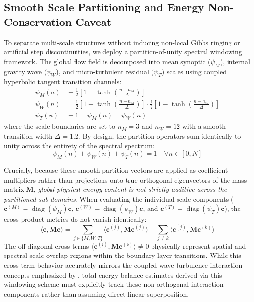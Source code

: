 \subsection{Smooth Scale Partitioning and Energy Non-Conservation Caveat}
\label{sec:methods:partition}

To separate multi-scale structures without inducing non-local Gibbs ringing or artificial step discontinuities, we deploy a partition-of-unity spectral windowing framework. The global flow field is decomposed into mean synoptic ($\psi_M$), internal gravity wave ($\psi_W$), and micro-turbulent residual ($\psi_T$) scales using coupled hyperbolic tangent transition channels:
\begin{align}
    \psi_M(n) &= \frac{1}{2}\left[1 - \tanh\left(\frac{n - n_M}{\Delta}\right)\right] \label{eq:psi_m_def} \\
    \psi_W(n) &= \frac{1}{2}\left[1 + \tanh\left(\frac{n - n_M}{\Delta}\right)\right] \cdot \frac{1}{2}\left[1 - \tanh\left(\frac{n - n_W}{\Delta}\right)\right] \label{eq:psi_w_def} \\
    \psi_T(n) &= 1 - \psi_M(n) - \psi_W(n) \label{eq:psi_t_def}
\end{align}
where the scale boundaries are set to $n_M = 3$ and $n_W = 12$ with a smooth transition width $\Delta = 1.2$. By design, the partition operators sum identically to unity across the entirety of the spectral spectrum:
\begin{equation}
\psi_M(n) + \psi_W(n) + \psi_T(n) = 1 \quad \forall n \in [0, N]
\label{eq:partition_unity}
\end{equation}

Crucially, because these smooth partition vectors are applied as coefficient multipliers rather than projections onto true orthogonal eigenvectors of the mass matrix $\mathbf{M}$, \emph{global physical energy content is not strictly additive across the partitioned sub-domains}. When evaluating the individual scale components ($\mathbf{c}^{(M)} = \operatorname{diag}(\psi_M)\mathbf{c}$, $\mathbf{c}^{(W)} = \operatorname{diag}(\psi_W)\mathbf{c}$, and $\mathbf{c}^{(T)} = \operatorname{diag}(\psi_T)\mathbf{c}$), the cross-product metrics do not vanish identically:
\begin{equation}
\langle \mathbf{c}, \mathbf{M} \mathbf{c} \rangle = \sum_{j \in \{M,W,T\}} \langle \mathbf{c}^{(j)}, \mathbf{M} \mathbf{c}^{(j)} \rangle + \sum_{j \neq k} \langle \mathbf{c}^{(j)}, \mathbf{M} \mathbf{c}^{(k)} \rangle
\label{eq:energy_overlap}
\end{equation}
The off-diagonal cross-terms $\langle \mathbf{c}^{(j)}, \mathbf{M} \mathbf{c}^{(k)} \rangle \neq 0$ physically represent spatial and spectral scale overlap regions within the boundary layer transitions. While this cross-term behavior accurately mirrors the coupled wave-turbulence interaction concepts emphasized by \citet{Sun2015}, total energy balance estimates derived via this windowing scheme must explicitly track these non-orthogonal interaction components rather than assuming direct linear superposition.

